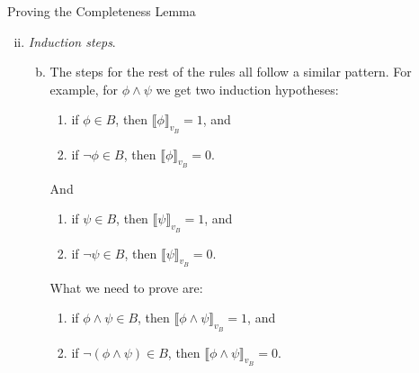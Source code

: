 \begin{frame}{Proving the Completeness Lemma}

\begin{enumerate}[(i)]
	
	\setcounter{enumi}{1}
	
	\item \emph{Induction steps}.
	
		\begin{enumerate}[(a)]
		\setcounter{enumii}{1}

		\item The steps for the rest of the rules all follow a similar pattern.
		For example, for $\phi\land \psi$ we get two induction hypotheses:
		\begin{enumerate}[1$_\phi$.]
	
		\item if $\phi\in B$, then $\llbracket\phi\rrbracket_{v_B}=1$, and 
		\item if $\neg \phi\in B$, then $\llbracket\phi\rrbracket_{v_B}=0$.
	
	\end{enumerate}
	
	And
	
	\begin{enumerate}[1$_\psi$.]
	
		\item if $\psi\in B$, then $\llbracket\psi\rrbracket_{v_B}=1$, and 
		\item if $\neg \psi\in B$, then $\llbracket\psi\rrbracket_{v_B}=0$.
	
	\end{enumerate}
	
	\medskip
	
	What we need to prove are:
	\begin{enumerate}
	
		\item if $\phi\land \psi\in B$, then $\llbracket\phi\land \psi\rrbracket_{v_B}=1$, and 
		\item if $\neg (\phi\land \psi)\in B$, then $\llbracket\phi\land \psi\rrbracket_{v_B}=0$.
	\end{enumerate}
		
	
		\end{enumerate}
	
	\end{enumerate}
	
\end{frame}

